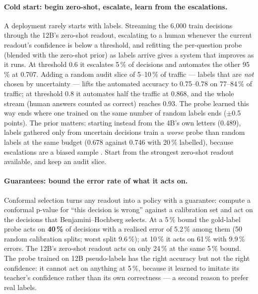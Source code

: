 \documentclass[11pt,a4paper]{article}
\begin{document}
\paragraph{Cold start: begin zero-shot, escalate, learn from the escalations.} A deployment rarely starts with labels. Streaming the 6,000 train decisions through the 12B's zero-shot readout, escalating to a human whenever the current readout's confidence is below a threshold, and refitting the per-question probe (blended with the zero-shot prior) as labels arrive gives a system that improves as it runs. At threshold 0.6 it escalates 5\,\% of decisions and automates the other 95\,\% at 0.707. Adding a random audit slice of 5--10\,\% of traffic --- labels that are \emph{not} chosen by uncertainty --- lifts the automated accuracy to 0.75--0.78 on 77--84\,\% of traffic; at threshold 0.8 it automates half the traffic at 0.868, and the whole stream (human answers counted as correct) reaches 0.93. The probe learned this way ends where one trained on the same number of random labels ends ($\pm$0.5 points). The prior matters: starting instead from the 4B's own letters (0.489), labels gathered only from uncertain decisions train a \emph{worse} probe than random labels at the same budget (0.678 against 0.746 with 20\,\% labelled), because escalations are a biased sample \cite{rauch}. Start from the strongest zero-shot readout available, and keep an audit slice.

\paragraph{Guarantees: bound the error rate of what it acts on.} Conformal selection \cite{confsel} turns any readout into a policy with a guarantee: compute a conformal p-value for ``this decision is wrong'' against a calibration set and act on the decisions that Benjamini--Hochberg selects. At a 5\,\% bound the gold-label probe acts on \textbf{40\,\%} of decisions with a realised error of 5.2\,\% among them (50 random calibration splits; worst split 9.6\,\%); at 10\,\% it acts on 61\,\% with 9.9\,\% errors. The 12B's zero-shot readout acts on only 24\,\% at the same 5\,\% bound. The probe trained on 12B pseudo-labels has the right accuracy but not the right confidence: it cannot act on anything at 5\,\%, because it learned to imitate its teacher's confidence rather than its own correctness --- a second reason to prefer real labels.
\end{document}
